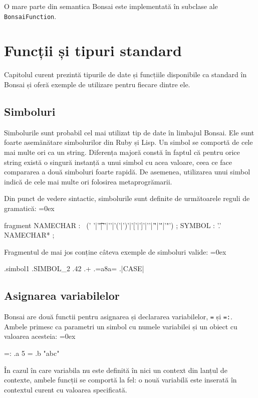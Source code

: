 \documentclass[12pt,a4paper]{memoir}
\renewcommand{\c}{\texttt}
\newenvironment{code}
{
\definecolor{shadecolor}{gray}{0.91}
\topsep=0ex
\relax
\shaded
\verbatim
}
{
\endverbatim
\endshaded
}
\begin{document}
O mare parte din semantica Bonsai este implementată în subclase ale \c{BonsaiFunction}. 

\chapter{Funcții și tipuri standard}

Capitolul curent prezintă tipurile de date și funcțiile disponibile ca standard în Bonsai și oferă exemple de utilizare pentru fiecare dintre ele.

\section{Simboluri}

Simbolurile sunt probabil cel mai utilizat tip de date în limbajul Bonsai. Ele sunt foarte asemănătare simbolurilor din Ruby\cite{ruby_symbols} și Lisp\cite{clhs_symbols}. Un simbol se comportă de cele mai multe ori ca un string. Diferența majoră constă în faptul că pentru orice string există o singură instanță a unui simbol cu acea valoare, ceea ce face compararea a două simboluri foarte rapidă. De asemenea, utilizarea unui simbol indică de cele mai multe ori folosirea metaprogrămarii.

Din punct de vedere sintactic, simbolurile sunt definite de următoarele reguli de gramatică:
\begin{code}
fragment NAMECHAR
    :   ~(' '|'\t'|'{'|'}'|'('|')'|'['|']'|'\n'|'\r'|'\''|'"')
    ;
SYMBOL
    :   '.' NAMECHAR*
    ;
\end{code}
Fragmentul de mai jos conține câteva exemple de simboluri valide:
\begin{code}
.simbol1
.SIMBOL_2
.42
.+
.=a8a=
.|CASE|
\end{code}

\section{Asignarea variabilelor}

Bonsai are două functii pentru asignarea și declararea variabilelor, \c{=} și \c{=:}. Ambele primesc ca parametri un simbol cu numele variabilei și un obiect cu valoarea acesteia:
\begin{code}
=: .a 5
= .b "abc"
\end{code}

În cazul în care variabila nu este definită în nici un context din lanțul de contexte, ambele funcții se comportă la fel: o nouă variabilă este inserată în contextul curent cu valoarea specificată. 
\end{document}
